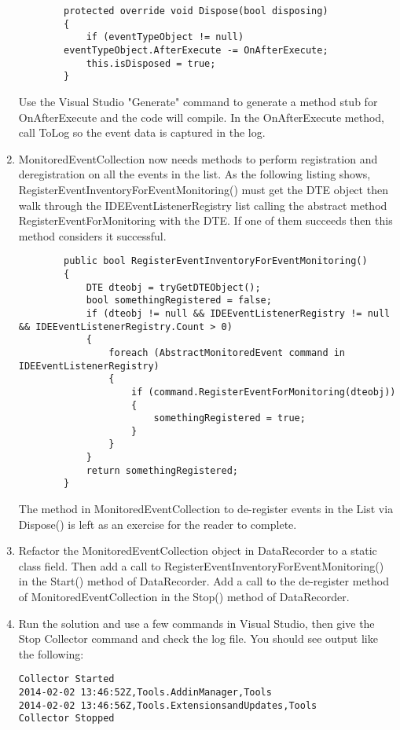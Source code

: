 \begin{enumerate}
\begin{lstlisting}
        protected override void Dispose(bool disposing)
        {
            if (eventTypeObject != null) 
		eventTypeObject.AfterExecute -= OnAfterExecute;
            this.isDisposed = true;
        }
\end{lstlisting}

Use the Visual Studio "Generate" command to generate a method stub for OnAfterExecute and the
code will compile.  In the OnAfterExecute method, call ToLog so the event data is captured in the log.

\item
MonitoredEventCollection now needs methods to perform registration and deregistration on all the events in the list.  As the following listing shows, RegisterEventInventoryForEventMonitoring() must get the DTE object then walk through the IDEEventListenerRegistry list calling the abstract method RegisterEventForMonitoring with the DTE.  If one of them succeeds then this method considers it successful.

\begin{lstlisting}
        public bool RegisterEventInventoryForEventMonitoring()
        {
            DTE dteobj = tryGetDTEObject();
            bool somethingRegistered = false;
            if (dteobj != null && IDEEventListenerRegistry != null && IDEEventListenerRegistry.Count > 0)
            {
                foreach (AbstractMonitoredEvent command in IDEEventListenerRegistry)
                {
                    if (command.RegisterEventForMonitoring(dteobj))
                    {
                        somethingRegistered = true;
                    }
                }
            }
            return somethingRegistered;
        }
\end{lstlisting}

The method in MonitoredEventCollection to de-register events in the List via Dispose() is left as an exercise for the reader to complete.

\item
Refactor the MonitoredEventCollection object in DataRecorder to a static class field.  Then add a call to RegisterEventInventoryForEventMonitoring() in the Start() method of DataRecorder.  Add a call to the de-register method of MonitoredEventCollection in the Stop() method of DataRecorder.  

\item
Run the solution and use a few commands in Visual Studio, then give the Stop Collector command and check the log file.  You should see output like the following:
\begin{verbatim}
Collector Started
2014-02-02 13:46:52Z,Tools.AddinManager,Tools
2014-02-02 13:46:56Z,Tools.ExtensionsandUpdates,Tools
Collector Stopped
\end{verbatim}


\end{enumerate}


